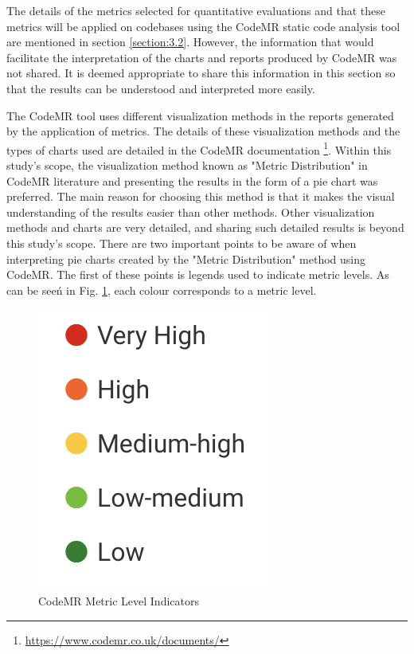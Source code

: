 The details of the metrics selected for quantitative evaluations and that these metrics will be applied on codebases using the CodeMR static code analysis tool are mentioned in section \ref{section:3.2}. However, the information that would facilitate the interpretation of the charts and reports produced by CodeMR was not shared. It is deemed appropriate to share this information in this section so that the results can be understood and interpreted more easily.

The CodeMR tool uses different visualization methods in the reports generated by the application of metrics. The details of these visualization methods and the types of charts used are detailed in the CodeMR documentation \footnote{ \url{https://www.codemr.co.uk/documents/}}. Within this study's scope, the visualization method known as "Metric Distribution" in CodeMR literature and presenting the results in the form of a pie chart was preferred. The main reason for choosing this method is that it makes the visual understanding of the results easier than other methods. Other visualization methods and charts are very detailed, and sharing such detailed results is beyond this study's scope. There are two important points to be aware of when interpreting pie charts created by the "Metric Distribution" method using CodeMR. The first of these points is legends used to indicate metric levels. As can be seeń in Fig. \ref{fig:code-mr-legends}, each colour corresponds to a metric level.
\begin{figure}[ht!]
    \centering
    \includegraphics[scale=0.7]{figures/code-mr-legends.png}
    \caption{CodeMR Metric Level Indicators}
    \label{fig:code-mr-legends}
\end{figure}


